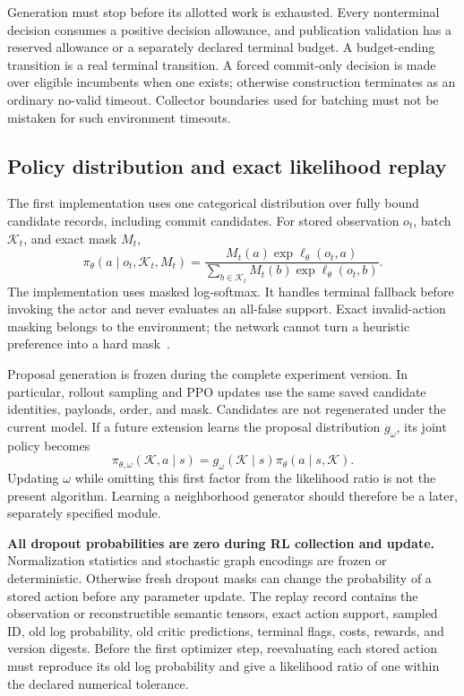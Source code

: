 Generation must stop before its allotted work is exhausted. Every nonterminal decision consumes a
positive decision allowance, and publication validation has a reserved allowance or a separately
declared terminal budget. A budget-ending transition is a real terminal transition. A forced
commit-only decision is made over eligible incumbents when one exists; otherwise construction
terminates as an ordinary no-valid timeout. Collector boundaries used for batching must not be
mistaken for such environment timeouts.

\subsection{Policy distribution and exact likelihood replay}

The first implementation uses one categorical distribution over fully bound candidate records,
including commit candidates. For stored observation \(o_t\), batch \(\mathcal K_t\), and exact mask
\(M_t\),
\begin{equation}
 \pi_\theta(a\mid o_t,\mathcal K_t,M_t)=
 \frac{M_t(a)\exp\ell_\theta(o_t,a)}
 {\sum_{b\in\mathcal K_t}M_t(b)\exp\ell_\theta(o_t,b)}.
 \label{eq:rl-flat-policy}
\end{equation}
The implementation uses masked log-softmax. It handles terminal fallback before invoking the actor
and never evaluates an all-false support. Exact invalid-action masking belongs to the environment;
the network cannot turn a heuristic preference into a hard mask~\cite{masking2020}.

Proposal generation is frozen during the complete experiment version. In particular, rollout
sampling and PPO updates use the same saved candidate identities, payloads, order, and mask.
Candidates are not regenerated under the current model. If a future extension learns the proposal
distribution \(g_\omega\), its joint policy becomes
\begin{equation}
 \pi_{\theta,\omega}(\mathcal K,a\mid s)
 =g_\omega(\mathcal K\mid s)\pi_\theta(a\mid s,\mathcal K).
\end{equation}
Updating \(\omega\) while omitting this first factor from the likelihood ratio is not the present
algorithm. Learning a neighborhood generator should therefore be a later, separately specified
module.

\textbf{All dropout probabilities are zero during RL collection and update.} Normalization
statistics and stochastic graph encodings are frozen or deterministic. Otherwise fresh dropout
masks can change the probability of a stored action before any parameter update. The replay record
contains the observation or reconstructible semantic tensors, exact action support, sampled ID,
old log probability, old critic predictions, terminal flags, costs, rewards, and version digests.
Before the first optimizer step, reevaluating each stored action must reproduce its old log
probability and give a likelihood ratio of one within the declared numerical tolerance.

